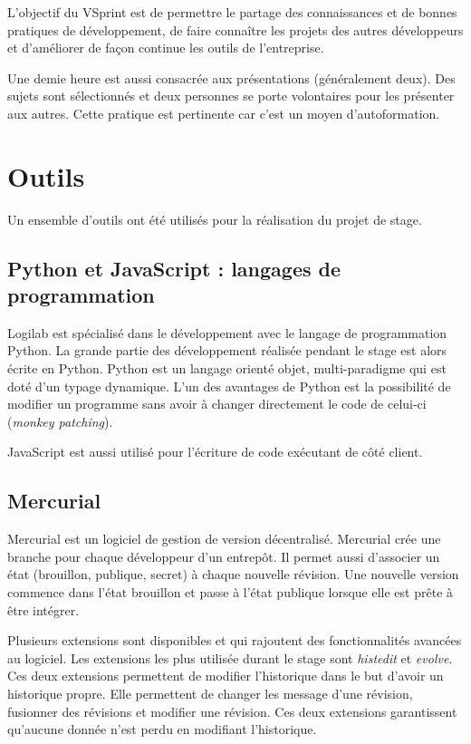 L'objectif du VSprint est de permettre le partage des connaissances et de bonnes pratiques de développement, de faire connaître les projets des autres développeurs et d'améliorer de façon continue les outils de l'entreprise. 

Une demie heure est aussi consacrée aux présentations (généralement deux). Des sujets sont sélectionnés et deux personnes se porte volontaires pour les présenter aux autres. Cette pratique est pertinente car c'est un moyen d'autoformation.

\section{Outils}
Un ensemble d'outils ont été utilisés pour la réalisation du projet de stage. 

\subsection{Python et JavaScript : langages de programmation}
Logilab est spécialisé dans le développement avec le langage de programmation Python. La grande partie des développement réalisée pendant le stage est alors écrite en Python. Python est un langage orienté objet, multi-paradigme qui est doté d'un typage dynamique. L'un des avantages de Python est la possibilité de modifier un programme sans avoir à changer directement le code de celui-ci (\textit{monkey patching}).

JavaScript est aussi utilisé pour l'écriture de code exécutant de côté client. 

\subsection{Mercurial}
Mercurial est un logiciel de gestion de version décentralisé. Mercurial crée une branche pour chaque développeur d'un entrepôt. Il permet aussi d'associer un état (brouillon, publique, secret) à chaque nouvelle révision. Une nouvelle version commence dans l'état brouillon et passe à l'état publique lorsque elle est prête à être intégrer. 

Plusieurs extensions sont disponibles et qui rajoutent des fonctionnalités avancées au logiciel. Les extensions les plus utilisée durant le stage sont \textit{histedit} et \textit{evolve}. Ces deux extensions permettent de modifier l'historique dans le but d'avoir un historique propre. Elle permettent de changer les message d'une révision, fusionner des révisions et modifier une révision. Ces deux extensions garantissent qu'aucune donnée n'est perdu en modifiant l'historique. 

